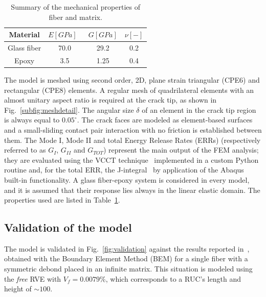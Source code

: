 \documentclass[review]{elsarticle}
\begin{document}
\begin{table}[!htbp]
 \centering
 \caption{Summary of the mechanical properties of fiber and matrix.}
 \begin{tabular}{cccc}
\textbf{Material} & \textbf{$E\left[GPa\right]$}\ & \textbf{$G\left[GPa\right]$} & \textbf{$\nu\left[-\right]$} \\
\midrule
Glass fiber    & 70.0  & 29.2   & 0.2  \\
Epoxy    & 3.5    & 1.25   & 0.4
\end{tabular}
\label{tab:phaseprop}
\end{table}

The model is meshed using second order, 2D, plane strain triangular (CPE6) and rectangular (CPE8) elements. A regular mesh of quadrilateral elements with an almost unitary aspect ratio is required at the crack tip, as shown in Fig.~\ref{subfig:meshdetail}. The angular size $\delta$ of an element in the crack tip region is always equal to $0.05^{\circ}$. The crack faces are modeled as element-based surfaces and a small-sliding contact pair interaction with no friction is established between them. The Mode I, Mode II and total Energy Release Rates (ERRs) (respectively referred to as $G_{I}$, $G_{II}$ and $G_{TOT}$) represent the main output of the FEM analysis; they are evaluated using the VCCT technique~\cite{Krueger2004} implemented in a custom Python routine and, for the total ERR, the J-integral~\cite{Rice1968} by application of the Abaqus built-in functionality. A glass fiber-epoxy system is considered in every model, and it is assumed that their response lies always in the linear elastic domain. The properties used are listed in Table~\ref{tab:phaseprop}.

\subsection{Validation of the model}

The model is validated in Fig.~\ref{fig:validation} against the results reported in~\cite{Paris2007,Sandino2016}, obtained with the Boundary Element Method (BEM) for a single fiber with a symmetric debond placed in an infinite matrix. This situation is modeled using the \textit{free} RVE with $V_{f}=0.0079\%$, which corresponds to a RUC's length and height of $\sim 100$.
\end{document}
